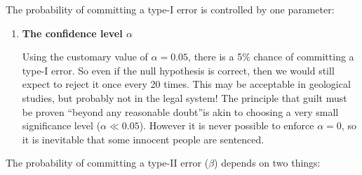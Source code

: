 The probability of committing a type-I error is controlled by one
parameter:

\begin{enumerate}
\item {\bf The confidence level $\alpha$}
  
  Using the customary value of $\alpha=0.05$, there is a 5\% chance of
  committing a type-I error. So even if the null hypothesis is
  correct, then we would still expect to reject it once every 20
  times. This may be acceptable in geological studies, but probably
  not in the legal system! The principle that guilt must be proven
  ``beyond any reasonable doubt''is akin to choosing a very small
  significance level ($\alpha\ll{0.05}$). However it is never possible
  to enforce $\alpha=0$, so it is inevitable that some innocent people
  are sentenced.
\end{enumerate}

The probability of committing a type-II error ($\beta$) depends on two
things:

